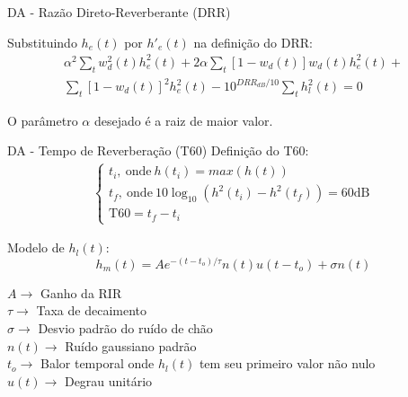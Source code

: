 \begin{frame}{DA - Razão Direto-Reverberante (DRR)}

    Substituindo $h_e(t)$ por $h'_e(t)$ na definição do DRR:
    \begin{equation*}
        \begin{aligned} 
            \alpha^2 \sum_t w^2_d(t) h^2_e(t) +
            2 \alpha \sum_t [1 - w_d(t)] w_d(t) h^2_e(t) + \\
            \sum_t [1 - w_d(t)]^2 h^2_e(t) -
            10^{DRR_{dB}/10} \sum_t h^2_l(t)
            = 0
        \end{aligned}
    \end{equation*}
    \vspace{0.5cm}

    O parâmetro $\alpha$ desejado é a raiz de maior valor.
    
\end{frame}

\begin{frame}{DA - Tempo de Reverberação (T60)}
    Definição do T60:
    \begin{align*}
        \begin{cases}
            t_i, \ \text{onde} \ h(t_i) = max(h(t)) \\
            t_f, \ \text{onde} \ 10 \log_{10} \left( h^2(t_i) - h^2(t_f) \right) = 60 \text{dB} \\
            \text{T60} = t_f-t_i
        \end{cases}
    \end{align*}
    \vspace{0.1cm}

    Modelo de $h_l(t)$:
    \begin{equation*}
        h_m(t) = A e^{-(t - t_o)/ \tau} n(t) u(t - t_o) + \sigma n(t)
    \end{equation*}
    \vspace{0.1cm}

    $A \rightarrow$ Ganho da RIR \\
    $\tau \rightarrow$ Taxa de decaimento \\
    $\sigma \rightarrow$ Desvio padrão do ruído de chão \\
    $n(t) \rightarrow$ Ruído gaussiano padrão \\
    $t_o \rightarrow$ Balor temporal onde $h_l(t)$ tem seu primeiro valor não nulo \\
    $u(t) \rightarrow$ Degrau unitário \\

\end{frame}

